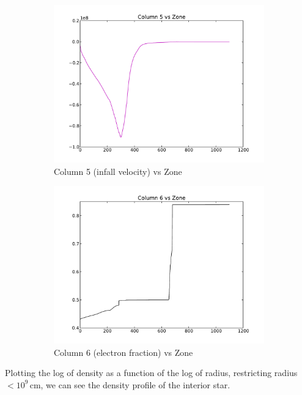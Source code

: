 \documentclass[11pt,letterpaper]{article}
\newcommand{\unit}[1]{\ensuremath{\, \mathrm{#1}}}
\begin{document}
\begin{figure}[bth]
\centering
\begin{subfigure}{.5\textwidth}
  \centering
  \includegraphics[width=.95\linewidth]{infall_vs_zone.pdf}
  \caption*{Column 5 (infall velocity) vs Zone}
  \label{fig:sub5}
\end{subfigure}%
\begin{subfigure}{.5\textwidth}
  \centering
  \includegraphics[width=.95\linewidth]{efrac_vs_zone.pdf}
  \caption*{Column 6 (electron fraction) vs Zone}
  \label{fig:sub6}
\end{subfigure}
\caption{}
\label{fig:cols56}
\end{figure}

Plotting the log of density as a function of the log of radius, restricting 
radius $< 10^9 \unit{cm}$, we can see the density profile of the interior star.
\end{document}
